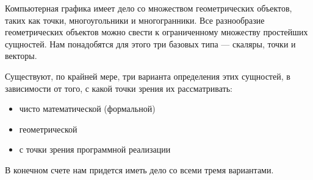 \documentclass[a4paper, 14pt]{extarticle}
\begin{document}
Компьютерная графика имеет дело со множеством геометрических объектов, таких как точки, многоугольники и многогранники. Все разнообразие геометрических объектов можно свести к ограниченному множеству простейших сущностей. Нам понадобятся для этого три базовых типа — скаляры, точки и векторы.

Существуют, по крайней мере, три варианта определения этих сущностей, в зависимости от того, с какой точки зрения их рассматривать:
\begin{itemize}
	\item чисто математической (формальной)
	\item геометрической
	\item с точки зрения программной реализации
\end{itemize}
В конечном счете нам придется иметь дело со всеми тремя вариантами.
\end{document}
